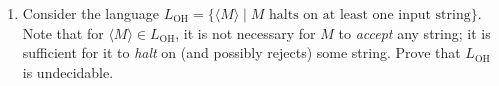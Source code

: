 \documentclass[11pt]{article}
\begin{document}
\begin{enumerate}
    \item Consider the language $L_{\text{OH}} = \{ \langle M\rangle
      \mid M \text{~halts on at least one input string}\}$. Note that
      for $\langle M\rangle \in L_{\text{OH}}$, it is not necessary
      for $M$ to {\em accept} any string; it is sufficient for it to
      {\em halt} on (and possibly rejects) some string. Prove that
      $L_{\text{OH}}$ is undecidable.

\end{enumerate}
\end{document}
